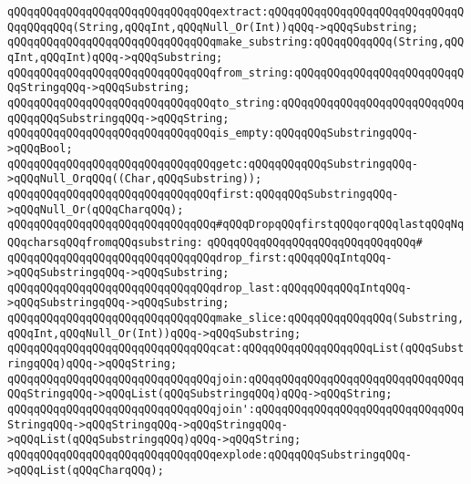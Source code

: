 \verb|qQQqqQQqqQQqqQQqqQQqqQQqqQQqqQQqextract:qQQqqQQqqQQqqQQqqQQqqQQqqQQqqQQqqQQqqQQq(String,qQQqInt,qQQqNull_Or(Int))qQQq->qQQqSubstring;|\newline
\verb|qQQqqQQqqQQqqQQqqQQqqQQqqQQqqQQqmake_substring:qQQqqQQqqQQq(String,qQQqInt,qQQqInt)qQQq->qQQqSubstring;|\newline
\verb|qQQqqQQqqQQqqQQqqQQqqQQqqQQqqQQqfrom_string:qQQqqQQqqQQqqQQqqQQqqQQqqQQqStringqQQq->qQQqSubstring;|\newline
\verb|qQQqqQQqqQQqqQQqqQQqqQQqqQQqqQQqto_string:qQQqqQQqqQQqqQQqqQQqqQQqqQQqqQQqqQQqSubstringqQQq->qQQqString;|\newline
\newline
\verb|qQQqqQQqqQQqqQQqqQQqqQQqqQQqqQQqis_empty:qQQqqQQqSubstringqQQq->qQQqBool;|\newline
\newline
\verb|qQQqqQQqqQQqqQQqqQQqqQQqqQQqqQQqgetc:qQQqqQQqqQQqSubstringqQQq->qQQqNull_OrqQQq((Char,qQQqSubstring));|\newline
\verb|qQQqqQQqqQQqqQQqqQQqqQQqqQQqqQQqfirst:qQQqqQQqSubstringqQQq->qQQqNull_Or(qQQqCharqQQq);|\newline
\newline
\verb|qQQqqQQqqQQqqQQqqQQqqQQqqQQqqQQq#qQQqDropqQQqfirstqQQqorqQQqlastqQQqNqQQqcharsqQQqfromqQQqsubstring:|\newline
\verb|qQQqqQQqqQQqqQQqqQQqqQQqqQQqqQQq#|\newline
\verb|qQQqqQQqqQQqqQQqqQQqqQQqqQQqqQQqdrop_first:qQQqqQQqIntqQQq->qQQqSubstringqQQq->qQQqSubstring;|\newline
\verb|qQQqqQQqqQQqqQQqqQQqqQQqqQQqqQQqdrop_last:qQQqqQQqqQQqIntqQQq->qQQqSubstringqQQq->qQQqSubstring;|\newline
\newline
\verb|qQQqqQQqqQQqqQQqqQQqqQQqqQQqqQQqmake_slice:qQQqqQQqqQQqqQQq(Substring,qQQqInt,qQQqNull_Or(Int))qQQq->qQQqSubstring;|\newline
\verb|qQQqqQQqqQQqqQQqqQQqqQQqqQQqqQQqcat:qQQqqQQqqQQqqQQqqQQqList(qQQqSubstringqQQq)qQQq->qQQqString;|\newline
\verb|qQQqqQQqqQQqqQQqqQQqqQQqqQQqqQQqjoin:qQQqqQQqqQQqqQQqqQQqqQQqqQQqqQQqqQQqStringqQQq->qQQqList(qQQqSubstringqQQq)qQQq->qQQqString;|\newline
\verb|qQQqqQQqqQQqqQQqqQQqqQQqqQQqqQQqjoin':qQQqqQQqqQQqqQQqqQQqqQQqqQQqqQQqStringqQQq->qQQqStringqQQq->qQQqStringqQQq->qQQqList(qQQqSubstringqQQq)qQQq->qQQqString;|\newline
\verb|qQQqqQQqqQQqqQQqqQQqqQQqqQQqqQQqexplode:qQQqqQQqSubstringqQQq->qQQqList(qQQqCharqQQq);|\newline
